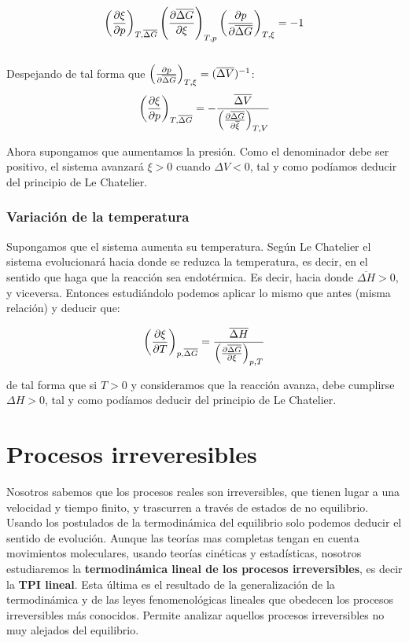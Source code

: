 \documentclass[12pt]{book}
\begin{document}
$$ \left( \frac{\partial \xi}{\partial p} \right)_{T, \overline{\Delta G}}  \left( \frac{\partial \overline{\Delta G}}{\partial \xi} \right)_{T,p} \left( \frac{\partial p}{\partial \overline{\Delta G}} \right)_{T,\xi} = - 1  $$ \\


Despejando de tal forma que $\left( \frac{\partial p}{\partial \overline{\Delta G}} \right)_{T,\xi} = (\overline{\Delta V})^{-1}$: \\

\begin{equation}
\left( \frac{\partial \xi}{\partial p} \right)_{T,\overline{\Delta G}} = -  \dfrac{\overline{\Delta V}}{\left( \frac{\partial \overline{\Delta G}}{\partial \overline{\xi}} \right)_{T,V}}
\end{equation}

Ahora supongamos que aumentamos la presión. Como el denominador debe ser positivo, el sistema avanzará $\xi >0$ cuando $\Delta V < 0$, tal y como podíamos deducir del principio de Le Chatelier. 

\subsection*{Variación de la temperatura}

Supongamos que el sistema aumenta su temperatura. Según Le Chatelier el sistema evolucionará hacia donde se reduzca la temperatura, es decir, en el sentido que haga que la reacción sea endotérmica. Es decir, hacia donde $\overline{\Delta H}>0$, y viceversa. Entonces estudiándolo podemos aplicar lo mismo que antes (misma relación) y deducir que:

\begin{equation}
\left( \frac{\partial \xi}{\partial T} \right)_{p,\overline{\Delta G}} =  \dfrac{\overline{\Delta H}}{\left( \frac{\partial \overline{\Delta G}}{\partial \xi} \right)_{p,T}}
\end{equation}

de tal forma que si $T>0$ y consideramos que la reacción avanza, debe cumplirse  $\Delta H >0$, tal y como podíamos deducir del principio de Le Chatelier.


\chapter{Procesos irreveresibles}

Nosotros sabemos que los procesos reales son irreversibles, que tienen lugar a una velocidad y tiempo finito, y trascurren a través de estados de no equilibrio. Usando los postulados de la termodinámica del equilibrio solo podemos deducir el sentido de evolución. Aunque las teorías mas completas tengan en cuenta movimientos moleculares, usando teorías cinéticas y estadísticas, nosotros estudiaremos la  \textbf{termodinámica lineal de los procesos irreversibles}, es decir la \textbf{TPI lineal}. Esta última es el resultado de la generalización de la termodinámica y de las leyes fenomenológicas lineales que obedecen los procesos irreversibles más conocidos. Permite analizar aquellos procesos irreversibles no muy alejados del equilibrio. \\
 
\end{document}
